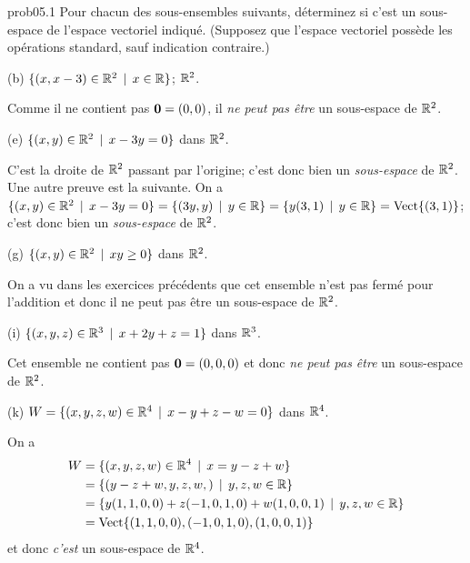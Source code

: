 
\bigskip
\begin{sol}{prob05.1}   Pour chacun des sous-ensembles suivants, déterminez si c'est un sous-espace de l'espace vectoriel indiqué. (Supposez que l'espace vectoriel possède les opérations standard, sauf indication contraire.)


\medskip

(b)  $\{(x, x-3) \in \mathbb{R}^2\, \mid \, x\in \mathbb{R}\}$; $\mathbb{R}^2$. 

\soln Comme il ne contient pas $\mathbf{0}=(0,0)$, il {\it ne peut pas être} un sous-espace de $\mathbb{R}^2$.
\medskip


(e)  $\{(x, y) \in \mathbb{R}^2\, \mid \, x -3y=0 \}$ dans $\mathbb{R}^2$.

\soln C'est la droite de $\mathbb{R}^2$ passant par l'origine; c'est donc bien un {\it sous-espace} de $\mathbb{R}^2$. 
Une autre preuve est la suivante. On a $\{(x, y) \in \mathbb{R}^2\, \mid \, x -3y=0 \}=\{(3y, y) \, \mid \, y\in \mathbb{R} \}=\{y(3,1)\, \mid \, y\in \mathbb{R}\}=\operatorname{ Vect} \normalsize\{(3,1)\normalsize\}$; c'est donc bien un {\it sous-espace} de $\mathbb{R}^2$. \medskip


(g)  $\{(x, y) \in \mathbb{R}^2\, \mid \, xy \ge 0 \}$ dans $\mathbb{R}^2$.

\soln On a vu dans les exercices précédents que cet ensemble n'est pas fermé pour l'addition et donc il ne peut pas être un sous-espace de $\mathbb{R}^2$.\medskip


(i)   $\{(x, y, z) \in \mathbb{R}^3\, \mid \, x+2y+z=1 \}$ dans $\mathbb{R}^3$.

\soln Cet ensemble ne contient pas $\mathbf{0} = (0,0,0)$ et donc  {\it ne peut pas être} un sous-espace de $\mathbb{R}^2$.\medskip 

 

(k) $W=\{(x, y, z, w) \in \mathbb{R}^4\, \mid \, x-y+z-w=0 \}$  dans $\mathbb{R}^4$. 

\soln On a 
\begin{align*}
W&=\{(x, y, z, w) \in \mathbb{R}^4\, \mid \, x=y-z+w\}\\
&=\{(y-z+w, y,z,w,)\, \mid \, y,z,w\in \mathbb{R}\}\\
&=\{y(1,1,0,0)+z(-1, 0,1,0)+w(1,0,0,1)\, \mid \, y,z,w\in \mathbb{R}\}\\
&=\operatorname{ Vect} \normalsize\{(1,1,0,0),(-1, 0,1,0),(1,0,0,1) \normalsize\}
\end{align*}
et donc {\it c'est} un sous-espace de $\mathbb{R}^4$.  \medskip

\end{sol}

